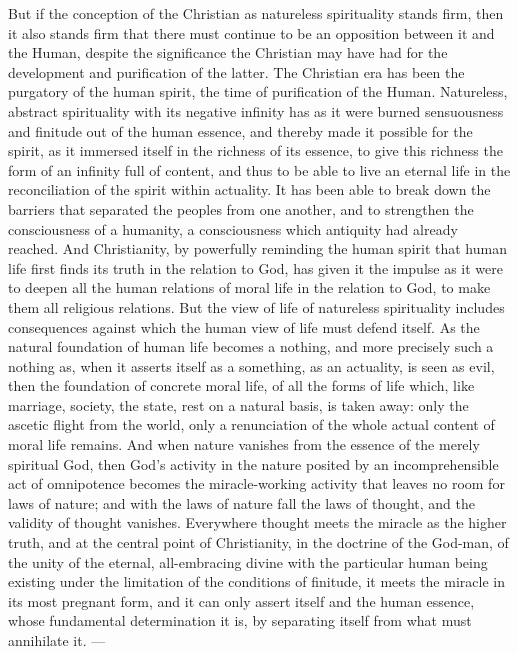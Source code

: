 \documentclass[12pt,a4paper,openany]{book}
\newcommand{\opage}[1]{\marginnote{\footnotesize\textit{[#1]}}}
\begin{document}
But if the conception of the Christian as
natureless spirituality stands firm, then it also stands firm that there
must continue to be an opposition between it and the
\opage{455}Human, despite the significance the Christian may have had for
the development and purification of the latter. The Christian era has
been the purgatory of the human spirit, the time of purification of the Human.
Natureless, abstract spirituality with its negative infinity
has as it were burned sensuousness and finitude
out of the human essence, and thereby made it possible for the spirit,
as it immersed itself in the richness of its essence, to give this richness
the form of an infinity full of content, and thus to be able to live
an eternal life in the reconciliation of the spirit within actuality.
It has been able to break down the barriers that separated the peoples from
one another, and to strengthen the consciousness of a humanity, a consciousness which
antiquity had already reached. And Christianity,
by powerfully reminding the human spirit that human life
first finds its truth in the relation to God, has given
it the impulse as it were to deepen all the human relations of moral life
in the relation to God, to make them all religious
relations. But the view of life of natureless spirituality
includes consequences against which the human view of life
must defend itself. As the natural foundation of human life
becomes a nothing, and more precisely such a nothing as, when it
asserts itself as a something, as an actuality, is seen
as evil, then the foundation of concrete moral
life, of all the forms of life which, like marriage, society,
the state, rest on a natural basis, is taken away: only
the ascetic flight from the world, only a renunciation of the whole actual content
of moral life remains. And when
nature vanishes from the essence of the merely spiritual God, then
God's activity in the nature posited by an incomprehensible act of omnipotence
becomes the miracle-working activity that leaves no
room for laws of nature; and with the laws of nature fall the laws of thought,
and the validity of thought vanishes. Everywhere
thought meets the miracle as the higher truth, and at the central point
of Christianity, in the doctrine of the God-man, of the unity of the eternal,
all-embracing divine with the particular human being existing under
the limitation of the conditions of finitude,
it meets the miracle in its most pregnant form, and it can
\opage{456}only assert itself and the human essence, whose fundamental determination
it is, by separating itself from what must annihilate
it. ---
\end{document}
